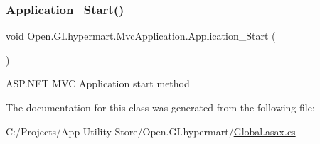 \subsubsection{\texorpdfstring{Application\+\_\+\+Start()}{Application\_Start()}}
{\footnotesize\ttfamily void Open.\+G\+I.\+hypermart.\+Mvc\+Application.\+Application\+\_\+\+Start (\begin{DoxyParamCaption}{ }\end{DoxyParamCaption})\hspace{0.3cm}{\ttfamily [protected]}}



A\+S\+P.\+N\+ET M\+VC Application start method 



The documentation for this class was generated from the following file\+:\begin{DoxyCompactItemize}
\item 
C\+:/\+Projects/\+App-\/\+Utility-\/\+Store/\+Open.\+G\+I.\+hypermart/\hyperlink{_global_8asax_8cs}{Global.\+asax.\+cs}\end{DoxyCompactItemize}
